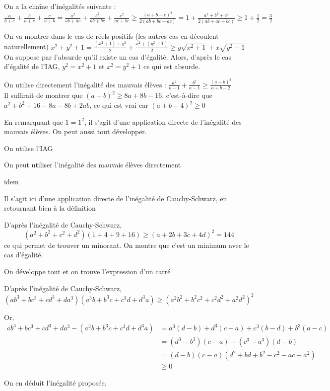 \sol On a la chaîne d'inégalités suivante : \\ $\frac{a}{b+c} + \frac{b}{a+c} + \frac{c}{a+b} = \frac{a^2}{ab+ac} + \frac{b^2}{ab+bc} + \frac{c^2}{ac+bc} \geq \frac{(a+b+c)^2}{2(ab+bc+ac)} = 1 + \frac{a^2+b^2+c^2}{2(ab+ac+bc)} \geq 1+\frac{1}{2} = \frac{3}{2}$

\sol On va montrer dans le cas de réels positifs (les autres cas en découlent naturellement)
$x^2+y^2+1 = \frac{(x^2+1)+y^2}{2} + \frac{x^2+(y^2+1)}{2} \geq y\sqrt{x^2+1}+x\sqrt{y^2+1}$\\ On suppose par l'absurde qu'il existe un cas d'égalité. Alors, d'après le cas d'égalité de l'IAG, $y^2=x^2+1$ et $x^2 = y^2+1$ ce qui est absurde. 

\sol On utilise directement l'inégalité des mauvais élèves : $\frac{a^2}{b-1} + \frac {b^2}{a-1} \geq \frac{(a+b)^2}{a+b-2}$\\ Il suffirait de montrer que $(a+b)^2 \geq 8a+8b-16$, c'est-à-dire que $a^2+b^2+16-8a-8b+2ab$, ce qui est vrai car $(a+b-4)^2 \geq 0$

\sol En remarquant que $1 = 1^2$, il s'agit d'une application directe de l'inégalité des mauvais élèves. On peut aussi tout développer.

\sol On utilise l'IAG

\sol On peut utiliser l'inégalité des mauvais élèves directement

\sol idem

\sol Il s'agit ici d'une application directe de l'inégalité de Cauchy-Schwarz, en retournant bien à la définition

\sol D'après l'inégalité de Cauchy-Schwarz, $$(a^2+b^2+c^2+d^2)(1+4+9+16) \geq (a+2b+3c+4d)^2 = 144$$ ce qui permet de trouver un minorant. On montre que c'est un minimum avec le cas d'égalité.

\sol On développe tout et on trouve l'expression d'un carré

\sol D'après l'inégalité de Cauchy-Schwarz, $$(ab^3 + bc^3+cd^3+da^3)(a^3b+b^3c+c^3d+d^3a) \geq (a^2b^2+b^2c^2+c^2d^2+a^2d^2)^2$$

Or, 
\begin{align*}
ab^3 + bc^3+cd^3+da^3 - (a^3b+b^3c+c^3d+d^3a) & = a^3(d-b) +d^3(c-a)+c^3(b-d)+b^3(a-c) \\
& = (d^3-b^3)(c-a)- (c^3-a^3)(d-b) \\
& = (d-b)(c-a)(d^2+bd+b^2-c^2-ac-a^2) \\
& \geq 0
\end{align*}

On en déduit l'inégalité proposée.
